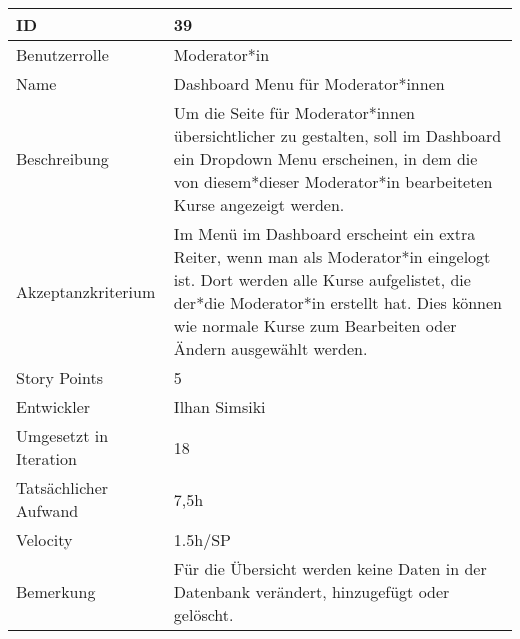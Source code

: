\begin{tabularx}{\textwidth}{|p{}|X|}
	\hline
	ID & 39 \\
	\hline
	Benutzerrolle & Moderator*in \\
	\hline
	Name & Dashboard Menu für Moderator*innen\\
	\hline
	Beschreibung & Um die Seite für Moderator*innen übersichtlicher zu gestalten, soll im Dashboard ein Dropdown Menu erscheinen, in dem die von diesem*dieser Moderator*in bearbeiteten Kurse angezeigt werden. \\
	\hline
	Akzeptanzkriterium & Im Menü im Dashboard erscheint ein extra Reiter, wenn man als Moderator*in eingelogt ist. Dort werden alle Kurse aufgelistet, die der*die Moderator*in erstellt hat. Dies können wie normale Kurse zum Bearbeiten oder Ändern ausgewählt werden. \\
	\hline
	Story Points & 5\\
	\hline
	Entwickler & Ilhan Simsiki\\
	\hline
	Umgesetzt in Iteration & 18\\
	\hline
	Tatsächlicher Aufwand & 7,5h \\
	\hline
	Velocity & 1.5h/SP\\
	\hline
	Bemerkung & Für die Übersicht werden keine Daten in der Datenbank verändert, hinzugefügt oder gelöscht.\\
	\hline
\end{tabularx}
\vspace{20pt}
